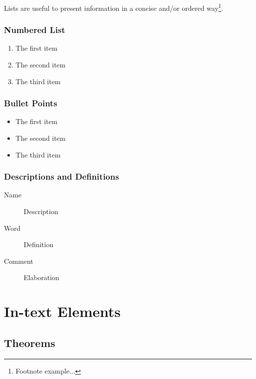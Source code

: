 \documentclass[11pt,fleqn]{book} %
\begin{document}
Lists are useful to present information in a concise and/or ordered way\footnote{Footnote example...}.

\subsection{Numbered List}

\begin{enumerate}
\item The first item
\item The second item
\item The third item
\end{enumerate}

\subsection{Bullet Points}

\begin{itemize}
\item The first item
\item The second item
\item The third item
\end{itemize}

\subsection{Descriptions and Definitions}

\begin{description}
\item[Name] Description
\item[Word] Definition
\item[Comment] Elaboration
\end{description}


\chapter{In-text Elements}

\section{Theorems}
\end{document}
